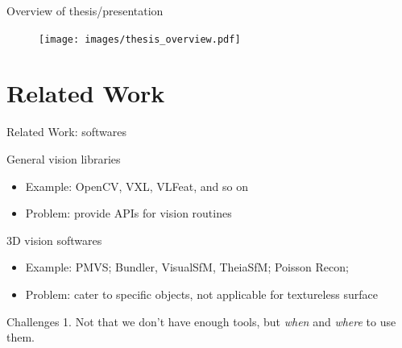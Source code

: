 \documentclass[10pt]{beamer}
\begin{document}



\begin{frame}{Overview of thesis/presentation}

\begin{figure}
\centering
\texttt{[image: images/thesis\_overview.pdf]}
\end{figure}

\end{frame}

\section{Related Work}
\begin{frame}{Related Work: softwares}


\begin{exampleblock}{General vision libraries}
\begin{itemize}
  \item Example: OpenCV, VXL, VLFeat, and so on
  \item Problem: provide APIs for vision routines
\end{itemize}
\end{exampleblock}

\begin{exampleblock}{3D vision softwares}
  \begin{itemize}
    \item Example: PMVS; Bundler, VisualSfM, TheiaSfM; Poisson Recon;
    \item Problem: cater to specific objects, not applicable for textureless surface
  \end{itemize}
\end{exampleblock}

\begin{alertblock}{Challenges}
1. Not that we don't have enough tools, but \textit{when} and \textit{where} to use them. \\
\end{alertblock}

\end{frame}
\end{document}
